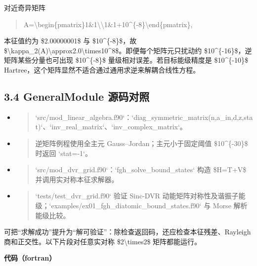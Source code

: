 \documentclass[UTF8,openany,11pt,fontset=fandol]{ctexbook}
\begin{document}
对近奇异矩阵

\begin{quote}
A=\textbackslash begin\{pmatrix\}1\&1\textbackslash\textbackslash1\&1+10\^{}\{-8\}\textbackslash end\{pmatrix\},
\end{quote}

本征值约为 \$2.00000001\$ 与 \$10\^{}\{-8\}\$，故
\$\textbackslash kappa\_2(A)\textbackslash approx2.0\textbackslash times10\^{}8\$。即便每个矩阵元只扰动约
\$10\^{}\{-16\}\$，逆矩阵某些分量也可出现 \$10\^{}\{-8\}\$
量级相对误差。若目标能级精度是 \$10\^{}\{-10\}\$
Hartree，这个矩阵显然不适合通过通用求逆来解耦合线性方程。

\subsection{\texorpdfstring{\textbf{3.4 GeneralModule
源码对照}}{3.4 GeneralModule 源码对照}}\label{generalmodule-ux6e90ux7801ux5bf9ux7167-2}

\begin{itemize}
\item
  \begin{quote}
  `src/mod\_linear\_algebra.f90`：`diag\_symmetric\_matrix(n,a\_in,d,z,stat)`、`inv\_real\_matrix`、`inv\_complex\_matrix`。
  \end{quote}
\item
  \begin{quote}
  逆矩阵例程使用全主元 Gauss--Jordan；主元小于固定阈值 \$10\^{}\{-30\}\$
  时返回 `stat=-1`。
  \end{quote}
\item
  \begin{quote}
  `src/mod\_dvr\_grid.f90`：`fgh\_solve\_bound\_states` 构造 \$H=T+V\$
  并调用实对称本征求解器。
  \end{quote}
\item
  \begin{quote}
  `tests/test\_dvr\_grid.f90` 验证 Sinc-DVR
  动能矩阵对称性及谐振子能级；`examples/ex01\_fgh\_diatomic\_bound\_states.f90`
  与 Morse 解析能级比较。
  \end{quote}
\end{itemize}

可把``求解成功''提升为``解可验证''：除检查返回码，还应检查本征残差、Rayleigh
商和正交性。以下片段对任意实对称 \$2\textbackslash times2\$
矩阵都能运行。

\textbf{代码（fortran）}
\end{document}
